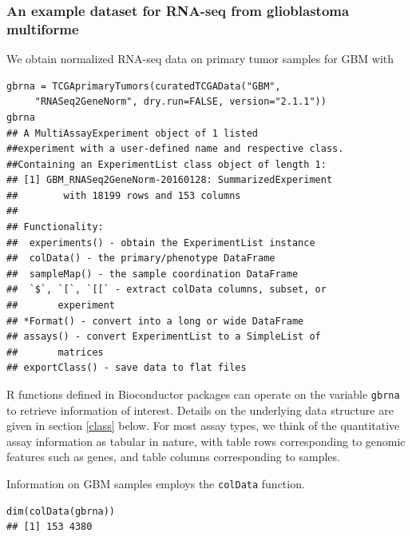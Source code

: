 \documentclass[graybox]{svmult}
\begin{document}
\subsubsection{An example dataset for RNA-seq from glioblastoma multiforme}\label{an-example-dataset-for-rna-seq-from-glioblastoma-multiforme}

We obtain normalized RNA-seq data on primary tumor samples for GBM with


\begin{shaded}
\begin{verbatim}
gbrna = TCGAprimaryTumors(curatedTCGAData("GBM",
     "RNASeq2GeneNorm", dry.run=FALSE, version="2.1.1"))
gbrna
## A MultiAssayExperiment object of 1 listed
##experiment with a user-defined name and respective class.
##Containing an ExperimentList class object of length 1:
## [1] GBM_RNASeq2GeneNorm-20160128: SummarizedExperiment 
##        with 18199 rows and 153 columns
##
## Functionality:
##  experiments() - obtain the ExperimentList instance
##  colData() - the primary/phenotype DataFrame
##  sampleMap() - the sample coordination DataFrame
##  `$`, `[`, `[[` - extract colData columns, subset, or 
##       experiment
## *Format() - convert into a long or wide DataFrame
## assays() - convert ExperimentList to a SimpleList of 
##       matrices
## exportClass() - save data to flat files
\end{verbatim}
\end{shaded}

R functions defined in Bioconductor packages can operate on the variable \texttt{gbrna} to
retrieve information of interest. Details on the underlying data structure
are given in section \ref{class} below. For most assay types, we think of the quantitative
assay
information as tabular in nature, with table rows corresponding to genomic
features such as genes, and table columns corresponding to samples.

Information on GBM samples employs the \texttt{colData} function.



\begin{shaded}
\begin{verbatim}
dim(colData(gbrna))
## [1] 153 4380
\end{verbatim}
\end{shaded}
\end{document}
